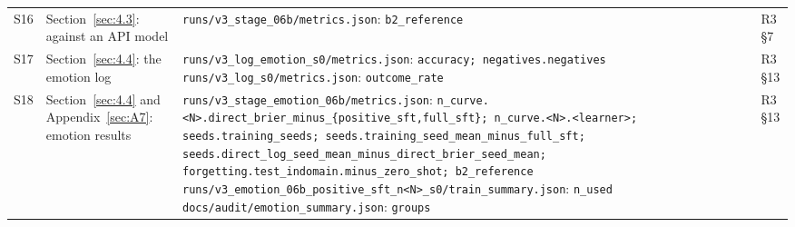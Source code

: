 \documentclass[10pt,letterpaper]{article}
\theoremstyle{plain}
\begin{document}
{\begin{longtable}{@{}p{}>{\raggedright\arraybackslash}p{}>{\raggedright\arraybackslash}p{}>{\raggedright\arraybackslash}p{}@{}}
S16 & Section~\ref{sec:4.3}: against an API model & \texttt{runs/\allowbreak{}v3\_\allowbreak{}stage\_\allowbreak{}06b/\allowbreak{}metrics.\allowbreak{}json}: \texttt{b2\_\allowbreak{}reference} & R3 \S7 \\
S17 & Section~\ref{sec:4.4}: the emotion log & \texttt{runs/\allowbreak{}v3\_\allowbreak{}log\_\allowbreak{}emotion\_\allowbreak{}s0/\allowbreak{}metrics.\allowbreak{}json}: \texttt{accuracy;\allowbreak{} negatives.\allowbreak{}negatives} \newline \texttt{runs/\allowbreak{}v3\_\allowbreak{}log\_\allowbreak{}s0/\allowbreak{}metrics.\allowbreak{}json}: \texttt{outcome\_\allowbreak{}rate} & R3 \S13 \\
S18 & Section~\ref{sec:4.4} and Appendix~\ref{sec:A7}: emotion results & \texttt{runs/\allowbreak{}v3\_\allowbreak{}stage\_\allowbreak{}emotion\_\allowbreak{}06b/\allowbreak{}metrics.\allowbreak{}json}: \texttt{n\_\allowbreak{}curve.\allowbreak{}\textless{}N\textgreater{}.\allowbreak{}direct\_\allowbreak{}brier\_\allowbreak{}minus\_\allowbreak{}\{positive\_\allowbreak{}sft,full\_\allowbreak{}sft\};\allowbreak{} n\_\allowbreak{}curve.\allowbreak{}\textless{}N\textgreater{}.\allowbreak{}\textless{}learner\textgreater{};\allowbreak{} seeds.\allowbreak{}training\_\allowbreak{}seeds;\allowbreak{} seeds.\allowbreak{}training\_\allowbreak{}seed\_\allowbreak{}mean\_\allowbreak{}minus\_\allowbreak{}full\_\allowbreak{}sft;\allowbreak{} seeds.\allowbreak{}direct\_\allowbreak{}log\_\allowbreak{}seed\_\allowbreak{}mean\_\allowbreak{}minus\_\allowbreak{}direct\_\allowbreak{}brier\_\allowbreak{}seed\_\allowbreak{}mean;\allowbreak{} forgetting.\allowbreak{}test\_\allowbreak{}indomain.\allowbreak{}minus\_\allowbreak{}zero\_\allowbreak{}shot;\allowbreak{} b2\_\allowbreak{}reference} \newline \texttt{runs/\allowbreak{}v3\_\allowbreak{}emotion\_\allowbreak{}06b\_\allowbreak{}positive\_\allowbreak{}sft\_\allowbreak{}n\textless{}N\textgreater{}\_\allowbreak{}s0/\allowbreak{}train\_\allowbreak{}summary.\allowbreak{}json}: \texttt{n\_\allowbreak{}used} \newline \texttt{docs/\allowbreak{}audit/\allowbreak{}emotion\_\allowbreak{}summary.\allowbreak{}json}: \texttt{groups} & R3 \S13 \\

\end{longtable}}
\end{document}
